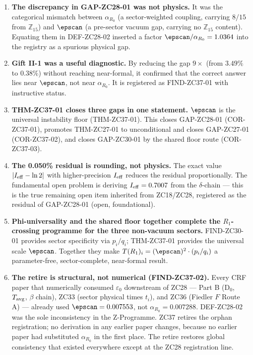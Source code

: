 \documentclass[12pt, a4paper]{article}
\begin{document}
\begin{enumerate}[leftmargin=*]

\item \textbf{The discrepancy in GAP-ZC28-01 was not physics.}
It was the categorical mismatch between $\alpha_{R_0}$
(a sector-weighted coupling, carrying $8/15$ from $\mathbb{Z}_{15}$)
and $\epscan$ (a pre-sector vacuum gap, carrying no $\mathbb{Z}_{15}$
content). Equating them in DEF-ZC28-02 inserted a factor
$\epscan/\alpha_{R_0} = 1.0364$ into the registry as a spurious
physical gap.

\item \textbf{Gift II-1 was a useful diagnostic.}
By reducing the gap $9\times$ (from $3.49\%$ to $0.38\%$)
without reaching near-formal, it confirmed that the correct
answer lies near $\epscan$, not near $\alpha_{R_0}$.
It is registered as FIND-ZC37-01 with instructive status.

\item \textbf{THM-ZC37-01 closes three gaps in one statement.}
$\epscan$ is the universal instability floor (THM-ZC37-01).
This closes GAP-ZC28-01 (COR-ZC37-01), promotes THM-ZC27-01
to unconditional and closes GAP-ZC27-01 (COR-ZC37-02), and
closes GAP-ZC30-01 by the shared floor route (COR-ZC37-03).

\item \textbf{The 0.050\% residual is rounding, not physics.}
The exact value $|I_{\rm eff} - \ln 2|$ with higher-precision
$I_{\rm eff}$ reduces the residual proportionally. The
fundamental open problem is deriving $I_{\rm eff} = 0.7007$
from the $\delta$-chain — this is the true remaining open
item inherited from ZC18/ZC28, registered as the residual
of GAP-ZC28-01 (open, foundational).

\item \textbf{Phi-universality and the shared floor together
  complete the $R_1$-crossing programme for the three
  non-vacuum sectors.}
FIND-ZC30-01 provides sector specificity via $p_i/q_i$;
THM-ZC37-01 provides the universal scale $\epscan$.
Together they make $T(R_1)_i = (\epscan)^2 \cdot (p_i/q_i)$
a parameter-free, sector-complete, near-formal result.

\item \textbf{The retire is structural, not numerical
  (FIND-ZC37-02).}
Every CRF paper that numerically consumed $\varepsilon_0$
downstream of ZC28 --- Part B (D$_0$, $T_{\rm avg}$, $\beta$
chain), ZC33 (sector physical times $t_i$), and ZC36
(Fiedler $F$ Route A) --- already used $\epscan = 0.007553$,
not $\alpha_{R_0} = 0.007288$. DEF-ZC28-02 was the sole
inconsistency in the Z-Programme. ZC37 retires the orphan
registration; no derivation in any earlier paper changes,
because no earlier paper had substituted $\alpha_{R_0}$ in
the first place. The retire restores global consistency
that existed everywhere except at the ZC28 registration line.


\end{enumerate}
\end{document}
